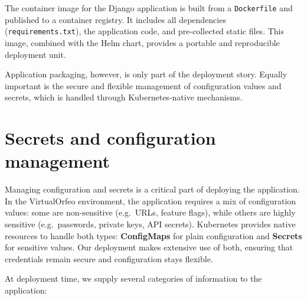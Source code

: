 \medskip

The container image for the Django application is built from a \texttt{Dockerfile} 
and published to a container registry. It includes all dependencies 
(\texttt{requirements.txt}), the application code, and pre-collected static 
files. This image, combined with the Helm chart, provides a portable and 
reproducible deployment unit.

\medskip
\noindent Application packaging, however, is only part of the deployment story. 
Equally important is the secure and flexible management of configuration values 
and secrets, which is handled through Kubernetes-native mechanisms.


\section{Secrets and configuration management}

Managing configuration and secrets is a critical part of deploying the application. In the VirtualOrfeo environment, the application requires a mix of configuration values: some are non-sensitive (e.g.\ URLs, feature flags), while others are highly sensitive (e.g.\ passwords, private keys, API secrets). Kubernetes provides native resources to handle both types: \textbf{ConfigMaps} for plain configuration and \textbf{Secrets} for sensitive values. Our deployment makes extensive use of both, ensuring that credentials remain secure and configuration stays flexible.

\medskip

At deployment time, we supply several categories of information to the application:

